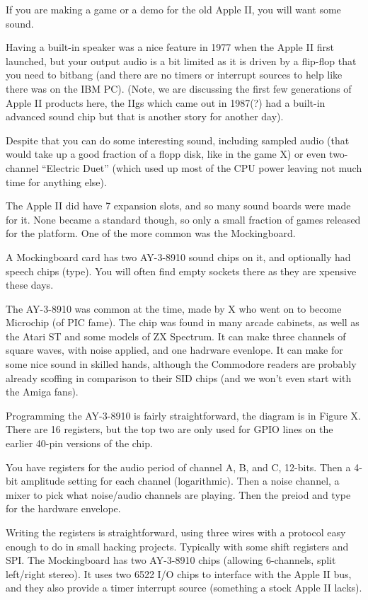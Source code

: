 

If you are making a game or a demo for the old Apple II, you will want
some sound.

Having a built-in speaker was a nice feature in 1977 when the Apple II
first launched, but your output audio is a bit limited as it is driven
by a flip-flop that you need to bitbang (and there are no timers or
interrupt sources to help like there was on the IBM PC).
(Note, we are discussing the first few generations of Apple II products here,
the IIgs which came out in 1987(?) had a built-in advanced sound chip
but that is another story for another day).

Despite that you can do some interesting sound, including sampled audio
(that would take up a  good fraction of a flopp disk, like in the game
X) or even two-channel ``Electric Duet'' (which used up most of the CPU
power leaving not much time for anything else).

The Apple II did have 7 expansion slots, and so many sound boards were
made for it.  None became a standard though, so only a small fraction
of games released for the platform.
One of the more common was the Mockingboard.

A Mockingboard card has two AY-3-8910 sound chips on it, and optionally
had speech chips (type).  You will often find empty sockets there as they
are xpensive these days.

The AY-3-8910 was common at the time, made by X who went on to become
Microchip (of PIC fame).
The chip was found in many arcade cabinets, as well as 
the Atari ST and some models of ZX Spectrum.
It can make three channels of square waves, with noise applied, and
one hadrware evenlope.
It can make for some nice sound in skilled hands, although the Commodore
readers are probably already scoffing in comparison to their SID chips
(and we won't even start with the Amiga fans).

Programming the AY-3-8910 is fairly straightforward, the diagram is in Figure
X.  There are 16 registers, but the top two are only used for GPIO lines
on the earlier 40-pin versions of the chip.

You have registers for the audio period of channel A, B, and C, 12-bits.
Then a 4-bit amplitude setting for each channel (logarithmic).
Then a noise channel, a mixer to pick what noise/audio channels are playing.
Then the preiod and type for the hardware envelope.

Writing the registers is straightforward, using three wires with a protocol
easy enough to do in small hacking projects.  Typically with some shift
registers and SPI. 
The Mockingboard has two AY-3-8910 chips (allowing 6-channels, split
left/right stereo).  It uses two 6522 I/O chips to interface with the
Apple II bus, and they also provide a timer interrupt source (something
a stock Apple II lacks).

